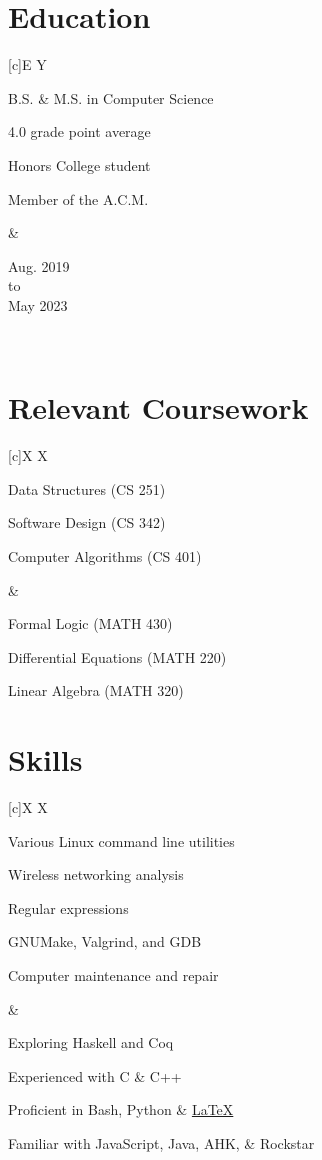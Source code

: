 \documentclass[10.5pt, letterpaper]{article}
\newenvironment{Education} %
{                          %
	\section*{Education}   %
	\flushleft             %
}{                         %
	\endflushleft          %
}
\newenvironment{Coursework}        %
{                                  %
	\section*{Relevant Coursework} %
	\flushleft                     %
	\tabularx{\textwidth}[c]{X X}  %
}{                                 %
	\endtabularx                   %
	\endflushleft                  %
}
\newenvironment{Skills}           %
{                                 %
	\section*{Skills}             %
	\flushleft                    %
	\tabularx{\textwidth}[c]{X X} %
}{                                %
	\endtabularx                  %
	\endflushleft                 %
}
\newenvironment{TitleDescription}[1]                    %
{                                                       %
	\begin{description}                                 %
		\item [#1]                                      %
		\let\realitem\item                              %
		\renewcommand{\item}[1]{\let\item\realitem ##1} %
}{                                                      %
	\end{description}                                   %
}
\newenvironment{EdEntry}[3]                 %
{                                           %
	\newcommand{\DateLine}{#2 \\ to \\ #3}  %
	\tabularx{\textwidth}[c]{E Y}           %
		\begin{multicols}{2}                %
			\begin{TitleDescription}{#1}    %
}{                                          %
			\end{TitleDescription}          %
		\end{multicols}                     %
		&                                   %
		\begin{center}\DateLine\end{center} %
		\\                                  %
	\endtabularx                            %
}
\begin{document}
\begin{Education}
	\begin{EdEntry}{University of Illinois at Chicago, Chicago, Il.}{Aug. 2019}{May 2023}
		\item B.S. \& M.S. in Computer Science 
		\item 4.0 grade point average
		\item Honors College student
		\item Member of the A.C.M.
	\end{EdEntry}
\end{Education}

\begin{Coursework}
		\begin{description}
			\item Data Structures (CS 251)
			\item Software Design (CS 342)
			\item Computer Algorithms (CS 401)
		\end{description} &
		\begin{description}
			\item Formal Logic (MATH 430)
			\item Differential Equations (MATH 220)
			\item Linear Algebra (MATH 320)
		\end{description}
\end{Coursework}

\begin{Skills}
	\begin{description}
		\item Various Linux command line utilities
		\item Wireless networking analysis
		\item Regular expressions
		\item GNUMake, Valgrind, and GDB
		\item Computer maintenance and repair	
	\end{description} &

	\begin{TitleDescription}{Programming Languages}
		\item Exploring Haskell and Coq
		\item Experienced with C \& C++
		\item Proficient in Bash, Python \& \href{https://github.com/baricus/resume}{\LaTeX{}}
		\item Familiar with JavaScript, Java, AHK, \& Rockstar
	\end{TitleDescription} 
\end{Skills}
\end{document}
